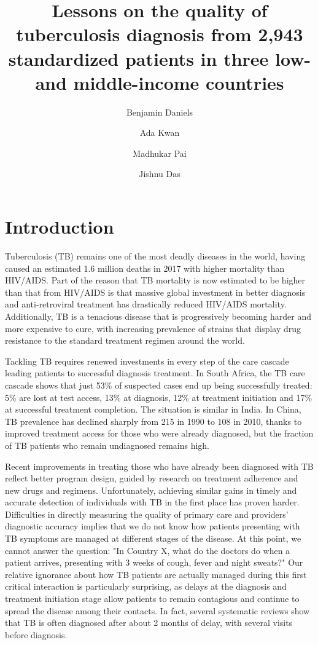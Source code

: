 \documentclass[fleqn,10pt]{wlscirep}
\title{Lessons on the quality of tuberculosis diagnosis from 2,943 standardized patients in three low- and middle-income countries}
\author[1]{Benjamin Daniels}
\author[1,2]{Ada Kwan}
\author[3]{Madhukar Pai}
\author[1,4]{Jishnu Das}
\affil[1]{Development Research Group, The World Bank, Washington, DC, USA}
\affil[2]{University of California at Berkeley, Berkeley, CA, USA}
\affil[3]{McGill International TB Centre and Department of Epidemiology and Biostatistics, McGill University, Montreal, QC, Canada}
\affil[4]{Center for Policy Research, New Delhi, India}
\begin{document}
\flushbottom
\maketitle

\thispagestyle{empty}
\newpage


\section*{Introduction}

Tuberculosis (TB) remains one of the most deadly diseases in the world, having caused an estimated 1.6 million deaths in 2017 with higher mortality than HIV/AIDS.\cite{world2018global} Part of the reason that TB mortality is now estimated to be higher than that from HIV/AIDS is that massive global investment in better diagnosis and anti-retroviral treatment has drastically reduced HIV/AIDS mortality. Additionally, TB is a tenacious disease that is progressively becoming harder and more expensive to cure, with increasing prevalence of strains that display drug resistance to the standard treatment regimen around the world.

Tackling TB requires renewed investments in every step of the care cascade leading patients to successful diagnosis treatment. In South Africa, the TB care cascade shows that just 53\% of suspected cases end up being successfully treated: 5\% are lost at test access, 13\% at diagnosis, 12\% at treatment initiation and 17\% at successful treatment completion.\cite{naidoo2017south} The situation is similar in India.\cite{subbaraman2016tuberculosis} In China, TB prevalence has declined sharply from 215 in 1990 to 108 in 2010, thanks to improved treatment access for those who were already diagnosed,\cite{whochina} but the fraction of TB patients who remain undiagnosed remains high.\cite{sylvia2017tuberculosis}

Recent improvements in treating those who have already been diagnosed with TB reflect better program design, guided by research on treatment adherence and new drugs and regimens.\cite{schnippel2018effect,for2018treatment} Unfortunately, achieving similar gains in timely and accurate detection of individuals with TB in the first place has proven harder. Difficulties in directly measuring the quality of primary care and providers' diagnostic accuracy implies that we do not know how patients presenting with TB symptoms are managed at different stages of the disease. At this point, we cannot answer the question: "In Country X, what do the doctors do when a patient arrives, presenting with 3 weeks of cough, fever and night sweats?" Our relative ignorance about how TB patients are actually managed during this first critical interaction is particularly surprising, as delays at the diagnosis and treatment initiation stage allow patients to remain contagious and continue to spread the disease among their contacts. In fact, several systematic reviews show that TB is often diagnosed after about 2 months of delay, with several visits before diagnosis.\cite{sreeramareddy2014delays,sreeramareddy2009time}
\end{document}
